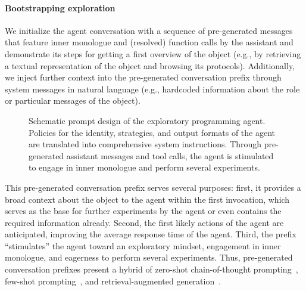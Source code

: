 \paragraph*{Bootstrapping exploration}
We initialize the agent conversation with a sequence of pre-generated messages that feature inner monologue and (resolved) function calls by the assistant and demonstrate its steps for getting a first overview of the object (e.g., by retrieving a textual representation of the object and browsing its protocols).
Additionally, we inject further context into the pre-generated conversation prefix through system messages in natural language (e.g., hardcoded information about the role or particular messages of the object).

\begin{figure}
	\centering
	\begin{threeparttable}
		\centering
		{\footnotesize
		}
	\end{threeparttable}
	\caption[Schematic prompt design of the exploratory programming agent.]{
		Schematic prompt design of the exploratory programming agent.
		Policies for the identity, strategies, and output formats of the agent are translated into comprehensive system instructions.
		Through pre-generated assistant messages and tool calls, the agent is stimulated to engage in inner monologue and perform several experiments.
	}
	\label{fig:agent/prompts/design}
\end{figure}

This pre-generated conversation prefix serves several purposes:
first, it provides a broad context about the object to the agent within the first invocation, which serves as the base for further experiments by the agent or even contains the required information already.
Second, the first likely actions of the agent are anticipated, improving the average response time of the agent.
Third, the prefix ``stimulates'' the agent toward an exploratory mindset, engagement in inner monologue, and eagerness to perform several experiments.
Thus, pre-generated conversation prefixes present a hybrid of zero-shot chain-of-thought prompting~\cite{kojima2022large}, few-shot prompting~\cite{brown2020language}, and retrieval-augmented generation~\cite{lewis2020retrieval}.
